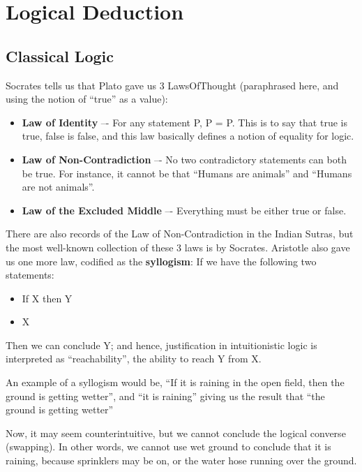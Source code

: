 \chapter{Logical Deduction}
\section{Classical Logic}
Socrates tells us that Plato gave us 3 \gls{LawsOfThought} (paraphrased here, and using the notion of ``true'' as a value):
\begin{itemize}
\item \textbf{Law of Identity} –- For any statement P, P = P. This is to say that true is true, false is false, and this law basically defines a notion of equality for logic.
\item \textbf{Law of Non-Contradiction} –- No two contradictory statements can both be true. For instance, it cannot be that ``Humans are animals'' and ``Humans are not animals''.
\item \textbf{Law of the Excluded Middle} –- Everything must be either true or false.
\end{itemize}

There are also records of the Law of Non-Contradiction in the Indian Sutras, but the most well-known collection of these 3 laws is by Socrates.
Aristotle also gave us one more law, codified as the \textbf{syllogism}:
If we have the following two statements:
\begin{itemize}
\item If X then Y
\item X
\end{itemize}
Then we can conclude Y; and hence, justification in intuitionistic logic is interpreted as “reachability”, the ability to reach Y from X.

An example of a syllogism would be, “If it is raining in the open field, then the ground is getting wetter”, and “it is raining” giving us the result that “the ground is getting wetter”

Now, it may seem counterintuitive, but we cannot conclude the logical converse (swapping). In other words, we cannot use wet ground to conclude that it is raining, because sprinklers may be on, or the water hose running over the ground.

